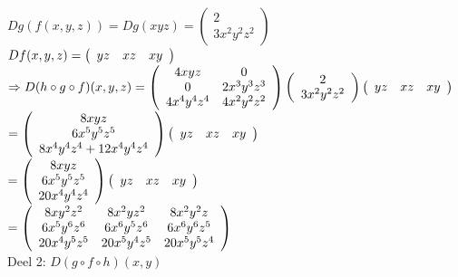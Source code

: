 \documentclass[a4paper]{article}
\begin{document}
$Dg(f(x,y,z)) = Dg(xyz) = \left(\begin{array}{c} 2 \\ 3x^2y^2z^2 \end{array}\right)$\\

$Df(x,y,z) = \left(\begin{array}{c c c} yz & xz & xy \end{array}\right)$\\

$\Rightarrow D(h \circ g \circ f)(x,y,z) = \left(\begin{array}{c c} 4xyz & 0 \\ 0 & 2x^3y^3z^3 \\ 4x^4y^4z^4 & 4x^2y^2z^2 \end{array}\right)   \left(\begin{array}{c} 2 \\ 3x^2y^2z^2 \end{array}\right)   \left(\begin{array}{c c c} yz & xz & xy \end{array}\right)$\\

$= \left(\begin{array}{c} 8xyz \\ 6x^5y^5z^5 \\ 8x^4y^4z^4 + 12x^4y^4z^4 \end{array}\right)   \left(\begin{array}{c c c} yz & xz & xy \end{array}\right)$\\

$= \left(\begin{array}{c} 8xyz \\ 6x^5y^5z^5 \\ 20x^4y^4z^4 \end{array}\right)   \left(\begin{array}{c c c} yz & xz & xy \end{array}\right)$\\

$= \left(\begin{array}{c c c} 8xy^2z^2 & 8x^2yz^2 & 8x^2y^2z \\ 6x^5y^6z^6 & 6x^6y^5z^6 & 6x^6y^6z^5 \\ 20x^4y^5z^5 & 20x^5y^4z^5 & 20x^5y^5z^4 \end{array}\right)$\\

Deel 2: $D(g \circ f \circ h)(x,y)$\\
\end{document}
